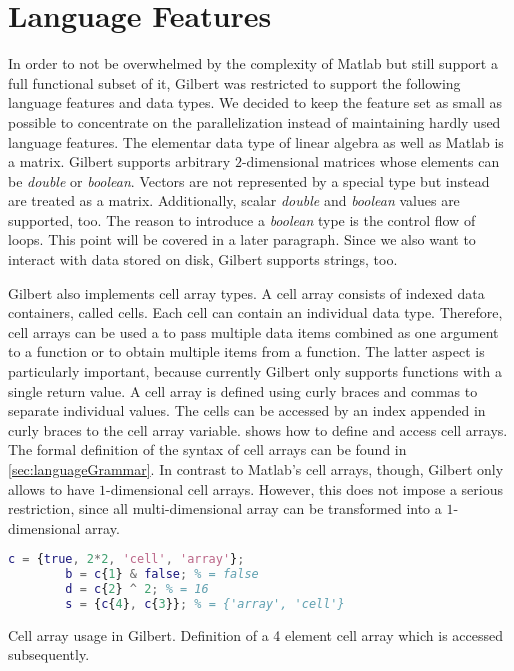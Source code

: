 \section{Language Features}

In order to not be overwhelmed by the complexity of Matlab but still support a full functional subset of it, Gilbert was restricted to support the following language features and data types.
We decided to keep the feature set as small as possible to concentrate on the parallelization instead of maintaining hardly used language features.
The elementar data type of linear algebra as well as Matlab is a matrix.
Gilbert supports arbitrary $2$-dimensional matrices whose elements can be \emph{double} or \emph{boolean}.
Vectors are not represented by a special type but instead are treated as a matrix.
Additionally, scalar \emph{double} and \emph{boolean} values are supported, too.
The reason to introduce a \emph{boolean} type is the control flow of loops.
This point will be covered in a later paragraph.
Since we also want to interact with data stored on disk, Gilbert supports strings, too.

Gilbert also implements cell array types.
A cell array consists of indexed data containers, called cells.
Each cell can contain an individual data type.
Therefore, cell arrays can be used a to pass multiple data items combined as one argument to a function or to obtain multiple items from a function.
The latter aspect is particularly important, because currently Gilbert only supports functions with a single return value.
A cell array is defined using curly braces and commas to separate individual values.
The cells can be accessed by an index appended in curly braces to the cell array variable.
 shows how to define and access cell arrays.
The formal definition of the syntax of cell arrays can be found in \cref{sec:languageGrammar}.
In contrast to Matlab's cell arrays, though, Gilbert only allows to have $1$-dimensional cell arrays.
However, this does not impose a serious restriction, since all multi-dimensional array can be transformed into a $1$-dimensional array. 

\begin{listing}[!h]
	\begin{CenteredBox}
		\begin{lstlisting}[language=Matlab]
		c = {true, 2*2, 'cell', 'array'};
		b = c{1} & false; % = false
		d = c{2} ^ 2; % = 16
		s = {c{4}, c{3}}; % = {'array', 'cell'} 
		\end{lstlisting}
	\end{CenteredBox}
	\caption{Cell array usage in Gilbert. Definition of a 4 element cell array which is accessed subsequently.}
	\label{lst:cellArray}
\end{listing}

